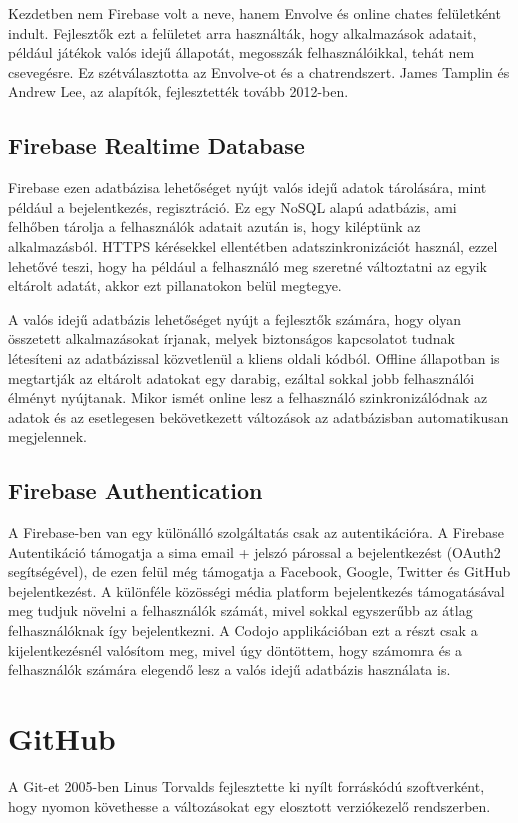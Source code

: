 \documentclass{thesis-ekf}
\begin{document}
	Kezdetben nem Firebase volt a neve, hanem Envolve és online chates felületként indult. Fejlesztők ezt a felületet arra használták, hogy alkalmazások adatait, például játékok valós idejű állapotát, megosszák felhasználóikkal, tehát nem csevegésre. Ez szétválasztotta az Envolve-ot és a chatrendszert. James Tamplin és Andrew Lee, az  alapítók, fejlesztették tovább 2012-ben.
	\cite{firebase}
	\subsection{Firebase Realtime Database}
	Firebase ezen adatbázisa lehetőséget nyújt valós idejű adatok tárolására, mint például a bejelentkezés, regisztráció. Ez egy NoSQL alapú adatbázis, ami felhőben tárolja a felhasználók adatait azután is, hogy kiléptünk az alkalmazásból. HTTPS kérésekkel ellentétben adatszinkronizációt használ, ezzel lehetővé teszi, hogy ha például a felhasználó meg szeretné változtatni az egyik eltárolt adatát, akkor ezt pillanatokon belül megtegye. 
	
	A valós idejű adatbázis lehetőséget nyújt a fejlesztők számára, hogy olyan összetett alkalmazásokat írjanak, melyek biztonságos kapcsolatot tudnak létesíteni az adatbázissal közvetlenül a kliens oldali kódból. Offline állapotban is megtartják az eltárolt adatokat egy darabig, ezáltal sokkal jobb felhasználói élményt nyújtanak. Mikor ismét online lesz a felhasználó szinkronizálódnak az adatok és az esetlegesen bekövetkezett változások az adatbázisban automatikusan megjelennek.
	\cite{firebase_realtime}
	\subsection{Firebase Authentication}
	A Firebase-ben van egy különálló szolgáltatás csak az autentikációra. A Firebase Autentikáció támogatja a sima email + jelszó párossal a bejelentkezést (OAuth2 segítségével), de ezen felül még támogatja a Facebook, Google, Twitter és GitHub bejelentkezést. A különféle közösségi média platform bejelentkezés támogatásával meg tudjuk növelni a felhasználók számát, mivel sokkal egyszerűbb az átlag felhasználóknak így bejelentkezni.\cite{firebase_auth} A Codojo applikációban ezt a részt csak a kijelentkezésnél valósítom meg, mivel úgy döntöttem, hogy számomra és a felhasználók számára elegendő lesz a valós idejű adatbázis használata is.
	\section{GitHub}
	A Git-et 2005-ben Linus Torvalds fejlesztette ki nyílt forráskódú szoftverként, hogy nyomon követhesse a változásokat egy elosztott verziókezelő rendszerben.
	
\end{document}
